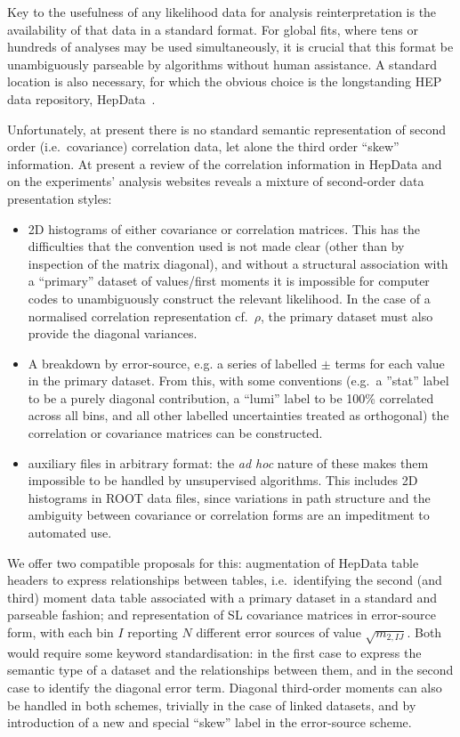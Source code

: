 \documentclass[11pt]{article}
\begin{document}
Key to the usefulness of any likelihood data for analysis reinterpretation is
the availability of that data in a standard format. For global fits, where tens
or hundreds of analyses may be used simultaneously, it is crucial that this
format be unambiguously parseable by algorithms without human assistance. A
standard location is also necessary, for which the obvious choice is the longstanding
HEP data repository, HepData~\cite{hepdata}.

Unfortunately, at present there is no standard semantic representation of second
order (i.e.~covariance) correlation data, let alone the third order ``skew''
information. At present a review of the correlation information in HepData and
on the experiments' analysis websites reveals a mixture of second-order data
presentation styles:
%
\begin{itemize}
\item 2D histograms of either covariance or correlation matrices. This has the
  difficulties that the convention used is not made clear (other than by
  inspection of the matrix diagonal), and without a structural association with
  a ``primary'' dataset of values/first moments it is impossible for computer
  codes to unambiguously construct the relevant likelihood. In the case of a
  normalised correlation representation cf.~$\rho$, the primary dataset must
  also provide the diagonal variances.
\item A breakdown by error-source, e.g. a series of labelled $\pm$ terms for
  each value in the primary dataset. From this, with some conventions (e.g.~a
  ''stat'' label to be a purely diagonal contribution, a ``lumi'' label to be
  100\% correlated across all bins, and all other labelled uncertainties treated
  as orthogonal) the correlation or covariance matrices can be constructed.
\item auxiliary files in arbitrary format: the \emph{ad hoc} nature of these
  makes them impossible to be handled by unsupervised algorithms. This includes
  2D histograms in ROOT data files, since variations in path structure and the
  ambiguity between covariance or correlation forms are an impeditment to
  automated use.
\end{itemize}

We offer two compatible proposals for this: augmentation of HepData table
headers to express relationships between tables, i.e.~identifying the second
(and third) moment data table associated with a primary dataset in a standard
and parseable fashion; and representation of SL covariance matrices in
error-source form, with each bin $I$ reporting $N$ different error sources of
value $\sqrt{m_{2,IJ}}$. Both would require some keyword standardisation: in the
first case to express the semantic type of a dataset and the relationships
between them, and in the second case to identify the diagonal error
term. Diagonal third-order moments can also be handled in both schemes,
trivially in the case of linked datasets, and by introduction of a new and
special ``skew'' label in the error-source scheme.
\end{document}
